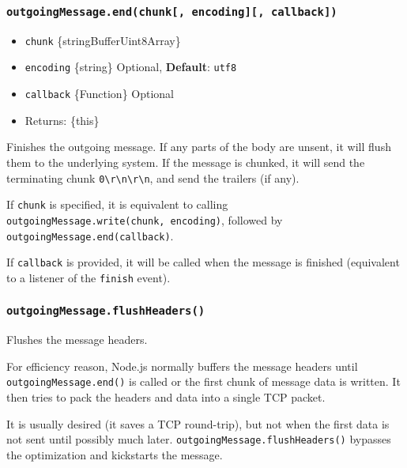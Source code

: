 \subsubsection{\texorpdfstring{\texttt{outgoingMessage.end(chunk{[},\ encoding{]}{[},\ callback{]})}}{outgoingMessage.end(chunk{[}, encoding{]}{[}, callback{]})}}\label{outgoingmessage.endchunk-encoding-callback}

\begin{itemize}
\tightlist
\item
  \texttt{chunk} \{string\textbar Buffer\textbar Uint8Array\}
\item
  \texttt{encoding} \{string\} Optional, \textbf{Default}: \texttt{utf8}
\item
  \texttt{callback} \{Function\} Optional
\item
  Returns: \{this\}
\end{itemize}

Finishes the outgoing message. If any parts of the body are unsent, it
will flush them to the underlying system. If the message is chunked, it
will send the terminating chunk
\texttt{0\textbackslash{}r\textbackslash{}n\textbackslash{}r\textbackslash{}n},
and send the trailers (if any).

If \texttt{chunk} is specified, it is equivalent to calling
\texttt{outgoingMessage.write(chunk,\ encoding)}, followed by
\texttt{outgoingMessage.end(callback)}.

If \texttt{callback} is provided, it will be called when the message is
finished (equivalent to a listener of the
\texttt{\textquotesingle{}finish\textquotesingle{}} event).

\subsubsection{\texorpdfstring{\texttt{outgoingMessage.flushHeaders()}}{outgoingMessage.flushHeaders()}}\label{outgoingmessage.flushheaders}

Flushes the message headers.

For efficiency reason, Node.js normally buffers the message headers
until \texttt{outgoingMessage.end()} is called or the first chunk of
message data is written. It then tries to pack the headers and data into
a single TCP packet.

It is usually desired (it saves a TCP round-trip), but not when the
first data is not sent until possibly much later.
\texttt{outgoingMessage.flushHeaders()} bypasses the optimization and
kickstarts the message.

